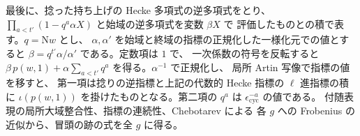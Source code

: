 最後に、捻った持ち上げの Hecke 多項式の逆多項式をとり、
\(\prod_{a<t'}(1-q^a\alpha X)\) と始域の逆多項式を変数 \(\beta X\) で
評価したものとの積で表す。\(q=\mathrm Nw\) とし、
\(\alpha,\alpha'\) を始域と終域の指標の正規化した一様化元での値とすると
\(\beta=q^{t'}\alpha/\alpha'\) である。定数項は \(1\) で、
一次係数の符号を反転すると
\(\beta\,p(w,1)+\alpha\sum_{a<t'}q^a\) を得る。\(\alpha^{-1}\) で正規化し、
局所 Artin 写像で指標の値を移すと、
第一項は捻りの逆指標と上記の代数的 Hecke 指標の \(\ell\) 進指標の積に
\(\iota(p(w,1))\) を掛けたものとなる。第二項の \(q^a\) は
\(\epsilon_{\mathrm{cyc}}^{-a}\) の値である。
付随表現の局所大域整合性、指標の連続性、Chebotarev による
各 \(g\) への Frobenius の近似から、冒頭の跡の式を全 \(g\) に得る。

